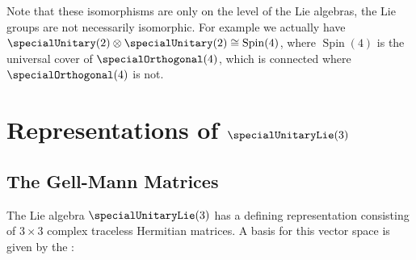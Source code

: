\documentclass[fleqn]{NotesClass}
\newcommand{\isomorphic}{\cong}
\begin{document}
    Note that these isomorphisms are only on the level of the Lie algebras, the Lie groups are not necessarily isomorphic.
    For example we actually have \(\specialUnitary(2) \otimes \specialUnitary(2) \isomorphic \operatorname{Spin}(4)\), where \(\operatorname{Spin}(4)\) is the universal cover of \(\specialOrthogonal(4)\), which is connected where \(\specialOrthogonal(4)\) is not.
    
    \chapter{Representations of \texorpdfstring{\(\specialUnitaryLie(3)\)}{su(3)}}
    \section{The Gell-Mann Matrices}
    The Lie algebra \(\specialUnitaryLie(3)\) has a defining representation consisting of \(3 \times 3\) complex traceless Hermitian matrices.
    A basis for this vector space is given by the :
\end{document}
